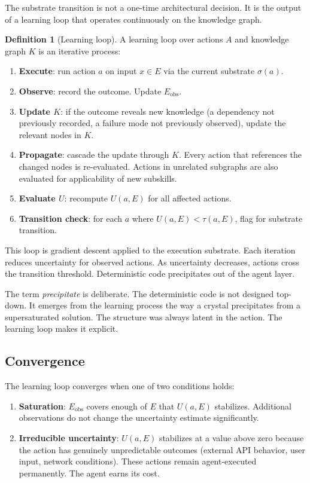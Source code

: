 \documentclass[11pt]{article}
\theoremstyle{definition}
\newtheorem{definition}{Definition}
\begin{document}
The substrate transition is not a one-time architectural decision. It
is the output of a learning loop that operates continuously on the
knowledge graph.

\begin{definition}[Learning loop]
\label{def:learning-loop}
A learning loop over actions $A$ and knowledge graph $K$ is an
iterative process:
\begin{enumerate}
\item \textbf{Execute}: run action $a$ on input $x \in E$ via the
   current substrate $\sigma(a)$.
\item \textbf{Observe}: record the outcome. Update $E_{\text{obs}}$.
\item \textbf{Update $K$}: if the outcome reveals new knowledge
   (a dependency not previously recorded, a failure mode not previously
   observed), update the relevant nodes in $K$.
\item \textbf{Propagate}: cascade the update through $K$. Every action
   that references the changed nodes is re-evaluated. Actions in
   unrelated subgraphs are also evaluated for applicability of new
   subskills.
\item \textbf{Evaluate $U$}: recompute $U(a, E)$ for all affected
   actions.
\item \textbf{Transition check}: for each $a$ where
   $U(a, E) < \tau(a, E)$, flag for substrate transition.
\end{enumerate}
\end{definition}

This loop is gradient descent applied to the execution substrate. Each
iteration reduces uncertainty for observed actions. As uncertainty
decreases, actions cross the transition threshold. Deterministic code
precipitates out of the agent layer.

The term \emph{precipitate} is deliberate. The deterministic code is
not designed top-down. It emerges from the learning process the way a
crystal precipitates from a supersaturated solution. The structure was
always latent in the action. The learning loop makes it explicit.

\subsection{Convergence}

The learning loop converges when one of two conditions holds:

\begin{enumerate}
\item \textbf{Saturation}: $E_{\text{obs}}$ covers enough of $E$ that
   $U(a, E)$ stabilizes. Additional observations do not change the
   uncertainty estimate significantly.

\item \textbf{Irreducible uncertainty}: $U(a, E)$ stabilizes at a value
   above zero because the action has genuinely unpredictable outcomes
   (external API behavior, user input, network conditions). These
   actions remain agent-executed permanently. The agent earns its cost.
\end{enumerate}
\end{document}
